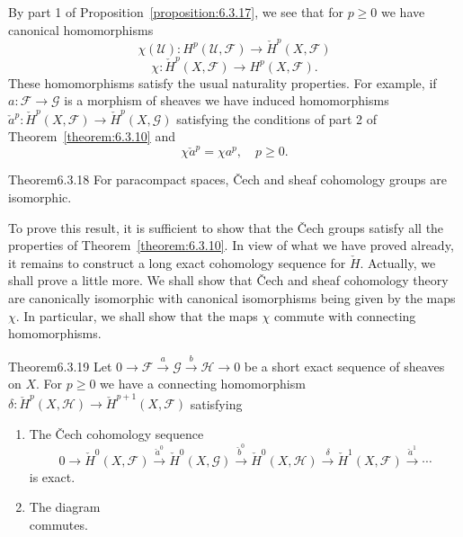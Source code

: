 By part 1 of Proposition~\ref{proposition:6.3.17}, we see that for $p\geq0$ we have canonical homomorphisms
\[
\chi(\mathcal U):H^p(\mathcal U,\mathcal F)\to\check H^p(X,\mathcal F)
\]
\[
\chi:\check H^p(X,\mathcal F)\to H^p(X,\mathcal F).
\]
These homomorphisms satisfy the usual naturality properties. For example, if $a:\mathcal F\to\mathcal G$ is a morphism of sheaves we have induced homomorphisms $\check a^p:\check H^p(X,\mathcal F)\to\check H^p(X,\mathcal G)$ satisfying the conditions of part 2 of Theorem~\ref{theorem:6.3.10} and
\[
\chi\check a^p=\chi a^p,\quad p\geq0.
\]
\begin{originaltheorem}{Theorem}{6.3.18}
For paracompact spaces, \v{C}ech and sheaf cohomology groups are isomorphic.
\end{originaltheorem}
To prove this result, it is sufficient to show that the \v{C}ech groups satisfy all the properties of Theorem~\ref{theorem:6.3.10}. In view of what we have proved already, it remains to construct a long exact cohomology
sequence for $\check H$. Actually, we shall prove a little more. We shall show that \v{C}ech and sheaf cohomology theory are canonically isomorphic with canonical isomorphisms being given by the maps $\chi$. In particular, we shall show that the maps $\chi$ commute with connecting homomorphisms.
\begin{originaltheorem}{Theorem}{6.3.19}
Let $0\to\mathcal F\xrightarrow a\mathcal G\xrightarrow b\mathcal H\to0$ be a short exact sequence of sheaves on $X$. For $p\geq0$ we have a connecting homomorphism $\delta:\check H^p(X,\mathcal H)\to\check H^{p+1}(X,\mathcal F)$ satisfying
\begin{enumerate}[label=\Alph*.]
\item The \v{C}ech cohomology sequence
\[
0\to\check H^0(X,\mathcal F)\xrightarrow{\check a^0}\check H^0(X,\mathcal G)\xrightarrow{\check b^0}\check H^0(X,\mathcal H)\xrightarrow\delta\check H^1(X,\mathcal F)\xrightarrow{\check a^1}\cdots
\]
is exact.
\item The diagram
\[

\]
commutes.
\end{enumerate}
\end{originaltheorem}
